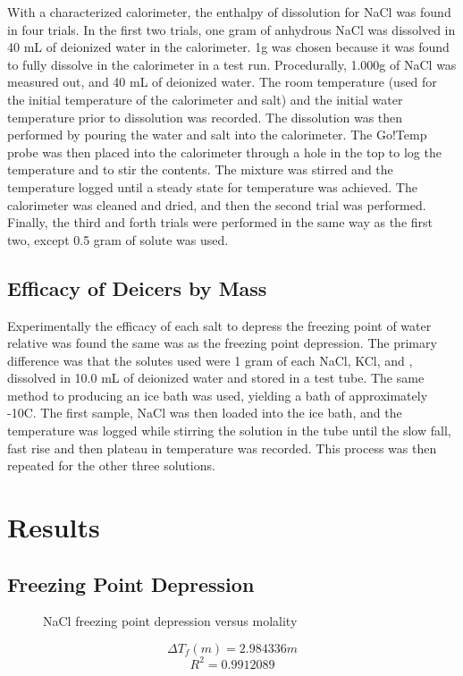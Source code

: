 \documentclass[12pt, letterpaper]{article}
\begin{document}
With a characterized calorimeter, the enthalpy of dissolution for NaCl was found in four trials. In the first two trials, one gram of anhydrous NaCl was dissolved in 40 mL of deionized water in the calorimeter. 1g was chosen because it was found to fully dissolve in the calorimeter in a test run. Procedurally, 1.000g of NaCl was measured out, and 40 mL of deionized water. The room temperature (used for the initial temperature of the calorimeter and salt) and the initial water temperature prior to dissolution was recorded. The dissolution was then performed by pouring the water and salt into the calorimeter. The Go!Temp probe was then placed into the calorimeter through a hole in the top to log the temperature and to stir the contents. The mixture was stirred and the temperature logged until a steady state for temperature was achieved. The calorimeter was cleaned and dried, and then the second trial was performed. Finally, the third and forth trials were performed in the same way as the first two, except 0.5 gram of solute was used.
\subsection{Efficacy of Deicers by Mass}
Experimentally the efficacy of each salt to depress the freezing point of water relative was found the same was as the freezing point depression. The primary difference was that the solutes used were 1 gram of each NaCl, KCl,  and , dissolved in 10.0 mL of deionized water and stored in a test tube. The same method to producing an ice bath was used, yielding a bath of approximately -10\space\textdegree C. The first sample, NaCl was then loaded into the ice bath, and the temperature was logged while stirring the solution in the tube until the slow fall, fast rise and then plateau in temperature was recorded. This process was then repeated for the other three solutions.
\section{Results}\singlespacing
\FloatBarrier
\subsection{Freezing Point Depression}
\begin{figure}[h!]
  \begin{center}
    	\resizebox{0.6\textwidth}{!}{}
  \end	{center}
  \caption{NaCl freezing point depression versus molality}
\end {figure}
\FloatBarrier
\begin{equation}
\Delta T_f(m) = 2.984336m 
\end{equation}
\begin{equation}
R^2 = 0.9912089
\end{equation}
\end{document}
